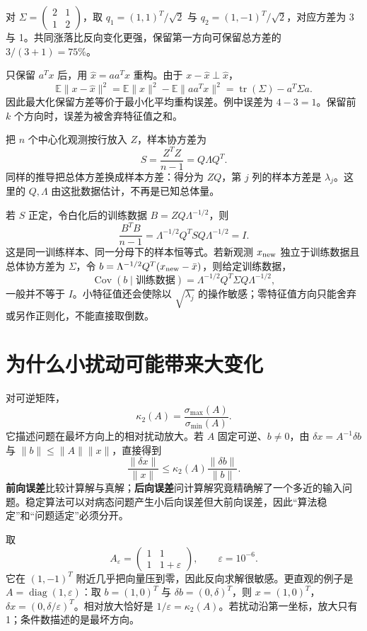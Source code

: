 对 $\Sigma=\left(\begin{smallmatrix}2&1\\1&2\end{smallmatrix}\right)$，取 $q_1=(1,1)^T/\sqrt2$ 与 $q_2=(1,-1)^T/\sqrt2$，对应方差为 3 与 1。共同涨落比反向变化更强，保留第一方向可保留总方差的 $3/(3+1)=75\%$。

只保留 $a^Tx$ 后，用 $\widehat x=aa^Tx$ 重构。由于 $x-\widehat x\perp\widehat x$，
\[
\mathbb E\|x-\widehat x\|^2
=\mathbb E\|x\|^2-\mathbb E\|aa^Tx\|^2
=\operatorname{tr}(\Sigma)-a^T\Sigma a.
\]
因此最大化保留方差等价于最小化平均重构误差。例中误差为 $4-3=1$。保留前 $k$ 个方向时，误差为被舍弃特征值之和。

把 $n$ 个中心化观测按行放入 $Z$，样本协方差为
\[
S=\frac{Z^TZ}{n-1}=Q\Lambda Q^T.
\]
同样的推导把总体方差换成样本方差：得分为 $ZQ$，第 $j$ 列的样本方差是 $\lambda_j$。这里的 $Q,\Lambda$ 由这批数据估计，不再是已知总体量。

若 $S$ 正定，令白化后的训练数据 $B=ZQ\Lambda^{-1/2}$，则
\[
\frac{B^TB}{n-1}=\Lambda^{-1/2}Q^TSQ\Lambda^{-1/2}=I.
\]
这是同一训练样本、同一分母下的样本恒等式。若新观测 $x_{\rm new}$ 独立于训练数据且总体协方差为 $\Sigma$，令 $b=\Lambda^{-1/2}Q^T(x_{\rm new}-\bar x)$，则给定训练数据，
\[
\operatorname{Cov}(b\mid\text{训练数据})
=\Lambda^{-1/2}Q^T\Sigma Q\Lambda^{-1/2},
\]
一般并不等于 $I$。小特征值还会使除以 $\sqrt{\lambda_j}$ 的操作敏感；零特征值方向只能舍弃或另作正则化，不能直接取倒数。

\section{为什么小扰动可能带来大变化}


对可逆矩阵，
\[
  \kappa_2(A)=\frac{\sigma_{\max}(A)}{\sigma_{\min}(A)}.
\]
它描述问题在最坏方向上的相对扰动放大。若 $A$ 固定可逆、$b\ne0$，由 $\delta x=A^{-1}\delta b$ 与 $\|b\|\le\|A\|\|x\|$，直接得到
\[
 \frac{\lVert\delta x\rVert}{\lVert x\rVert}
 \le \kappa_2(A)
 \frac{\lVert\delta b\rVert}{\lVert b\rVert}.
\]
\textbf{前向误差}比较计算解与真解；\textbf{后向误差}问计算解究竟精确解了一个多近的输入问题。稳定算法可以对病态问题产生小后向误差但大前向误差，因此“算法稳定”和“问题适定”必须分开。

取
\[
A_\varepsilon=\begin{pmatrix}1&1\\1&1+\varepsilon\end{pmatrix},
\qquad \varepsilon=10^{-6}.
\]
它在 $(1,-1)^T$ 附近几乎把向量压到零，因此反向求解很敏感。更直观的例子是 $A=\operatorname{diag}(1,\varepsilon)$：取 $b=(1,0)^T$ 与 $\delta b=(0,\delta)^T$，则 $x=(1,0)^T$，$\delta x=(0,\delta/\varepsilon)^T$。相对放大恰好是 $1/\varepsilon=\kappa_2(A)$。若扰动沿第一坐标，放大只有 1；条件数描述的是最坏方向。


